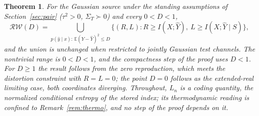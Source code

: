 \documentclass[11pt,onecolumn]{IEEEtran}
\newtheorem{theorem}{Theorem}
\newcommand{\E}{\mathbb{E}}
\newcommand{\hY}{\widehat{Y}}
\newcommand{\RW}{\mathcal{R}\!\mathcal{W}}
\begin{document}
\begin{theorem}\label{thm:gaussop}
For the Gaussian source under the standing assumptions of
Section~\ref{sec:pair} ($\tau^2>0$, $\Sigma_T\succ0$) and every $0<D<1$,
\[
\RW(D)=\bigcup_{p(\hat y\mid x):\,\E(Y-\hY)^2\le D}
\bigl\{(R,L):R\ge I(X;\hY),\ L\ge I(X;\hY\mid S)\bigr\},
\]
and the union is unchanged when restricted to jointly Gaussian test
channels. The nontrivial range is $0<D<1$, and the compactness step of
the proof uses $D<1$. For $D\ge1$ the result follows from the zero
reproduction, which meets the distortion constraint with $R=L=0$; the
point $D=0$ follows as the extended-real limiting case, both
coordinates diverging. Throughout, $L_n$ is a coding quantity, the
normalized conditional entropy of the stored index; its thermodynamic
reading is confined to Remark~\ref{rem:thermo}, and no step of the
proof depends on it.
\end{theorem}
\end{document}
